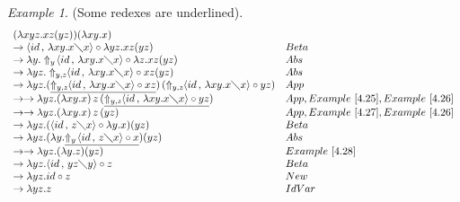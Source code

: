 \documentclass[11pt]{amsart}
\theoremstyle{plain}
\theoremstyle{definition}
\theoremstyle{remark}
\newtheorem{example}[theorem]{Example}
\numberwithin{equation}{section}
\newcommand{\ci}{\circ}
\newcommand{\mi}{\,,\,}
\newcommand{\is}{\diagdown}
\newcommand{\arrow}{\rightarrow}
\newcommand{\la}{\langle}
\newcommand{\ra}{\rangle}
\newcommand{\twoh}{\arrow\arrow}
\begin{document}
\begin{example}(Some redexes are underlined).\\
$$\begin{array}{ll} (\lambda x y z.xz(yz))(\lambda x
y.x) & \\
\arrow \la id\mi \lambda x y.x\is x\ra\ci\lambda
y z.xz(yz) & Beta\\
\arrow \lambda y.\Uparrow_{y}\!\la id\mi \lambda x
y.x\is x\ra\ci\lambda z. xz(yz) & Abs\\
 \arrow \lambda y z.\Uparrow_{y,z}\!\!\la
id\mi \lambda x y.x\is x\ra\ci xz(yz) & Abs\\
\arrow \lambda y z.(\underline{\Uparrow_{y,z}\!\!\la id\mi \lambda
x y.x\is x\ra\ci xz})\,(\Uparrow_{y,z}\!\!\la id\mi \lambda x
y.x\is x\ra\ci yz) &  App\\
\twoh \lambda y z.(\lambda x
y.x)\,z\,(\underline{\Uparrow_{y,z}\!\!\la id\mi \lambda x
y.x\is x\ra\ci yz}) &  App, Example~\ref{4.25},Example~\ref{4.26}\\
\twoh \lambda y z.(\lambda x
y.x)\,z\,(yz) & App,Example~\ref{4.27},Example~\ref{4.26}\\
\arrow \lambda y z.(\la id\mi z\is
x\ra\ci\lambda y.x)(yz) & Beta\\
\arrow \lambda y z.(\lambda
y.\underline{\Uparrow_y\!\la id\mi z\is x\ra\ci x})(yz) & Abs\\
\twoh \lambda y
z.(\lambda y. z)(yz) & Example~\ref{4.28}\\
\arrow \lambda y z.\la id\mi
yz\is y\ra\ci z & Beta\\
\arrow \lambda y z.id\ci
z & New\\
\arrow \lambda y z.z & IdVar
\end{array}$$
\end{example}
\end{document}
